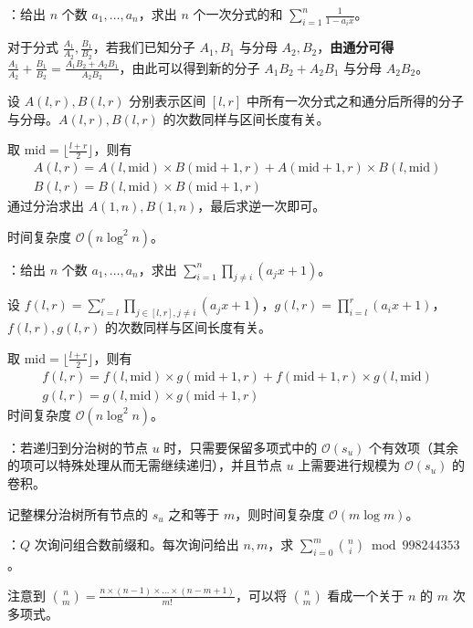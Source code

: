 ：给出 $n$ 个数 $a_1, \dots, a_n$，求出 $n$ 个一次分式的和 $\sum_{i = 1}^n \frac{1}{1 - a_ix}$。

对于分式 $\frac{A_1}{A_2}, \frac{B_1}{B_2}$，若我们已知分子 $A_1, B_1$ 与分母 $A_2, B_2$，\textbf{由通分可得} $\frac{A_1}{A_2} + \frac{B_1}{B_2} = \frac{A_1B_2 + A_2B_1}{A_2B_2}$，由此可以得到新的分子 $A_1B_2 + A_2B_1$ 与分母 $A_2B_2$。

设 $A(l, r), B(l, r)$ 分别表示区间 $[l, r]$ 中所有一次分式之和通分后所得的分子与分母。$A(l, r), B(l, r)$ 的次数同样与区间长度有关。

取 $\mathrm{mid} = \lfloor \frac{l + r}{2} \rfloor$，则有
\[
\begin{gathered}
A(l, r) = A(l, \mathrm{mid}) \times B(\mathrm{mid} + 1, r) + A(\mathrm{mid} + 1, r) \times B(l, \mathrm{mid}) \\
B(l, r) = B(l, \mathrm{mid}) \times B(\mathrm{mid} + 1, r)
\end{gathered}
\]
通过分治求出 $A(1, n), B(1, n)$，最后求逆一次即可。

时间复杂度 $\mathcal{O}(n \log^2 n)$。

：给出 $n$ 个数 $a_1, \dots, a_n$，求出 $\sum_{i = 1}^n \prod_{j \neq i} (a_jx + 1)$。

设 $f(l, r) = \sum_{i = l}^r \prod_{j \in [l, r], j \neq i} (a_jx + 1)$，$g(l, r) = \prod_{i = l}^r (a_ix + 1)$，$f(l, r), g(l, r)$ 的次数同样与区间长度有关。

取 $\mathrm{mid} = \lfloor \frac{l + r}{2} \rfloor$，则有
\[
\begin{gathered}
f(l, r) = f(l, \mathrm{mid}) \times g(\mathrm{mid} + 1, r) + f(\mathrm{mid} + 1, r) \times g(l, \mathrm{mid}) \\
g(l, r) = g(l, \mathrm{mid}) \times g(\mathrm{mid} + 1, r)
\end{gathered}
\]
时间复杂度 $\mathcal{O}(n \log^2 n)$。

：若递归到分治树的节点 $u$ 时，只需要保留多项式中的 $\mathcal{O}(s_u)$ 个有效项（其余的项可以特殊处理从而无需继续递归），并且节点 $u$ 上需要进行规模为 $\mathcal{O}(s_u)$ 的卷积。

记整棵分治树所有节点的 $s_u$ 之和等于 $m$，则时间复杂度 $\mathcal{O}(m \log m)$。

：$Q$ 次询问组合数前缀和。每次询问给出 $n, m$，求 $\sum_{i = 0}^m \binom{n}{i} \bmod 998244353$。

注意到 $\binom{n}{m} = \frac{n \times (n - 1) \times \dots \times (n - m + 1)}{m!}$，可以将 $\binom{n}{m}$ 看成一个关于 $n$ 的 $m$ 次多项式。

